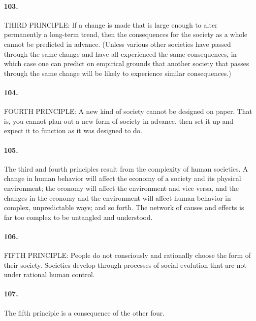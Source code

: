 \documentclass[12pt]{book}
\begin{document}
\paragraph{103.}  THIRD PRINCIPLE: If a change is made that is large enough to alter permanently a long-term trend, then the consequences for the society as a whole cannot be predicted in advance. (Unless various other societies have passed through the same change and have all experienced the same consequences, in which case one can predict on empirical grounds that another society that passes through the same change will be likely to experience similar consequences.)


\paragraph{104.}  FOURTH PRINCIPLE: A new kind of society cannot be designed on paper. That is, you cannot plan out a new form of society in advance, then set it up and expect it to function as it was designed to do.


\paragraph{105.} The third and fourth principles result from the complexity of human societies. A change in human behavior will affect the economy of a society and its physical environment; the economy will affect the environment and vice versa, and the changes in the economy and the environment will affect human behavior in complex, unpredictable ways; and so forth. The network of causes and effects is far too complex to be untangled and understood.


\paragraph{106.} FIFTH PRINCIPLE: People do not consciously and rationally choose the form of their society. Societies develop through processes of social evolution that are not under rational human control.


\paragraph{107.} The fifth principle is a consequence of the other four.
\end{document}
